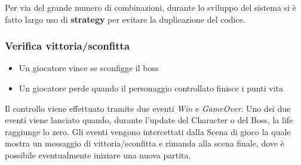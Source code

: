 Per via del grande numero di combinazioni, durante lo sviluppo del sistema si è fatto largo uso di \textbf{strategy} per evitare la duplicazione del codice. 

\subsubsection{Verifica vittoria/sconfitta}
\begin{itemize}
  \item Un giocatore vince se sconfigge il boss
  \item Un giocatore perde quando il personaggio controllato finisce i punti vita
\end{itemize}

Il controllo viene effettuato tramite due eventi \textit{Win} e \textit{GameOver}. 
Uno dei due eventi viene lanciato quando, durante l'update del Character o del Boss, la life raggiunge lo zero. 
Gli eventi vengono intercettati dalla Scena di gioco la quale mostra un messaggio di vittoria/sconfitta e rimanda alla scena finale, dove è possibile eventualmente iniziare una nuova partita. 

